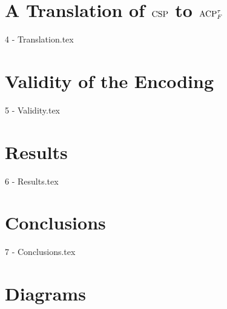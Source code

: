 \documentclass[logo,bsc,singlespacing,parskip,online]{infthesis}
\begin{document}
\chapter{A Translation of \texorpdfstring{$\mathrm{CSP}$}{CSP} to \texorpdfstring{$\mathrm{ACP}_{F}^{\tau}$}{ACP}}
{4 - Translation.tex}


\newpage
\chapter{Validity of the Encoding}
{5 - Validity.tex}

\chapter{Results}
{6 - Results.tex}

\chapter{Conclusions}
{7 - Conclusions.tex}






\appendix

\chapter{Diagrams}
\end{document}
